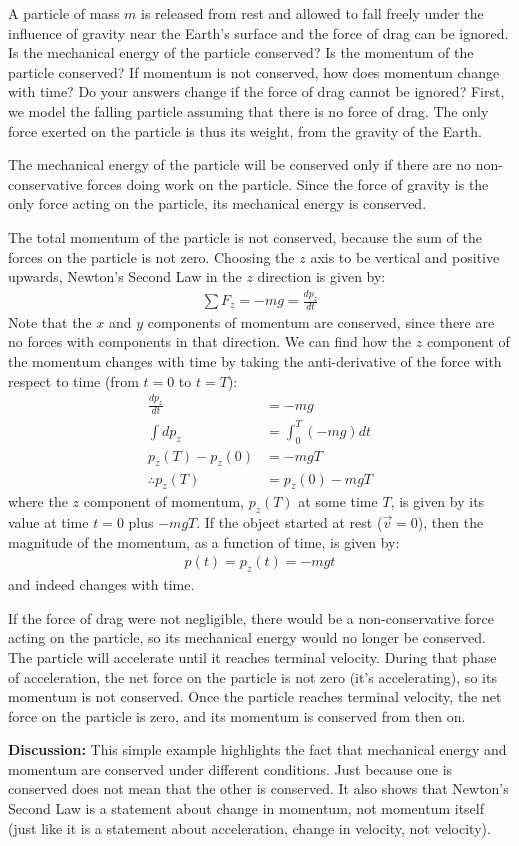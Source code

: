 \begin{example}{A particle of mass $m$ is released from rest and allowed to fall freely under the influence of gravity near the Earth's surface and the force of drag can be ignored. Is the mechanical energy of the particle conserved? Is the momentum of the particle conserved? If momentum is not conserved, how does momentum change with time? Do your answers change if the force of drag cannot be ignored?}
First, we model the falling particle assuming that there is no force of drag. The only force exerted on the particle is thus its weight, from the gravity of the Earth. 

The mechanical energy of the particle will be conserved only if there are no non-conservative forces doing work on the particle. Since the force of gravity is the only force acting on the particle, its mechanical energy is conserved.

The total momentum of the particle is not conserved, because the sum of the forces on the particle is not zero. Choosing the $z$ axis to be vertical and positive upwards, Newton's Second Law in the $z$ direction is given by:
\begin{align*}
\sum F_z = -mg=\frac{dp_z}{dt}
\end{align*}
Note that the $x$ and $y$ components of momentum are conserved, since there are no forces with components in that direction. We can find how the $z$ component of the momentum changes with time by taking the anti-derivative of the force with respect to time (from $t=0$ to $t=T$):
\begin{align*}
\frac{dp_z}{dt} &= -mg\\
\int dp_z &= \int_0^T (-mg) dt\\
p_z(T) - p_z(0) &= -mgT\\
\therefore p_z(T) &= p_z(0) - mgT
\end{align*}
where the $z$ component of momentum, $p_z(T)$ at some time $T$, is given by its value at time $t=0$ plus $-mgT$. If the object started at rest ($\vec v=0$), then the magnitude of the momentum, as a function of time, is given by:
\begin{align*}
p(t) = p_z(t) = -mgt
\end{align*}
and indeed changes with time.

If the force of drag were not negligible, there would be a non-conservative force acting on the particle, so its mechanical energy would no longer be conserved. The particle will accelerate until it reaches terminal velocity. During that phase of acceleration, the net force on the particle is not zero (it's accelerating), so its momentum is not conserved. Once the particle reaches terminal velocity, the net force on the particle is zero, and its momentum is conserved from then on.

\textbf{Discussion:} This simple example highlights the fact that mechanical energy and momentum are conserved under different conditions. Just because one is conserved does not mean that the other is conserved. It also shows that Newton's Second Law is a statement about change in momentum, not momentum itself (just like it is a statement about acceleration, change in velocity, not velocity).
\end{example}

